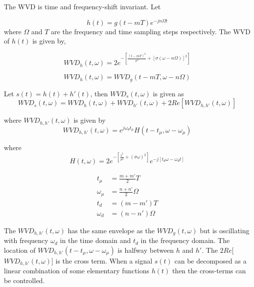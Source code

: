 The WVD is time and frequency-shift invariant. Let

\begin{equation}
h(t) = g(t-mT) e^{-jn\Omega t}
\end{equation} where $\Omega$ and $T$ are the frequency and time sampling steps respectively. The WVD of $h(t)$ is given by,

\begin{equation}
WVD_h(t,\omega) = 2e^{-[\frac{(t-mT)^2}{\sigma^2}+[\sigma(\omega-n\Omega)]^2]}
\end{equation}

\begin{equation}
WVD_h(t,\omega) = WVD_g(t-mT,\omega-n\Omega)
\end{equation}

Let $s(t) = h(t)+h'(t)$, then $WVD_s(t,\omega)$ is given as
\begin{equation}
WVD_s(t,\omega) = WVD_h(t,\omega)+WVD_{h'}(t,\omega)+2Re[{WVD_{h,h'}(t,\omega)}]
\end{equation}

where $WVD_{h,h'}(t,\omega)$ is given by
\begin{equation}
 WVD_{h,h'}(t,\omega) = e^{j\omega_d t_\mu} H(t-t_\mu, \omega-\omega_\mu)
\end{equation}

where
\begin{equation}
H(t,\omega) = 2e^{-[\frac{t^2}{\sigma^2}+(\sigma \omega)^2]} e^{-j[t_d\omega - \omega_dt]}
\end{equation}

\begin{equation}
\begin{aligned}
t_\mu &= \frac{m+m'}{2} T  \\
\omega_\mu &= \frac{n+n'}{2}\Omega \\
t_d &= (m - m')T \\
\omega_d &= (n-n')\Omega 
\end{aligned}
\end{equation}

The $WVD_{h,h'}(t,\omega)$ has the same envelope as the $WVD_g(t,\omega)$ but is oscillating with frequency $\omega_d$ in the time domain and $t_d$ in the frequency domain. The location of $WVD_{h,h'}(t-t_\mu,\omega-\omega_\mu)$ is halfway between $h$ and $h'$. The $2Re$[$WVD_{h,h'}(t,\omega)$] is the cross term. When a signal $s(t)$ can be decomposed as a linear combination of some elementary functions $h(t)$ then the cross-terms can be controlled. 

